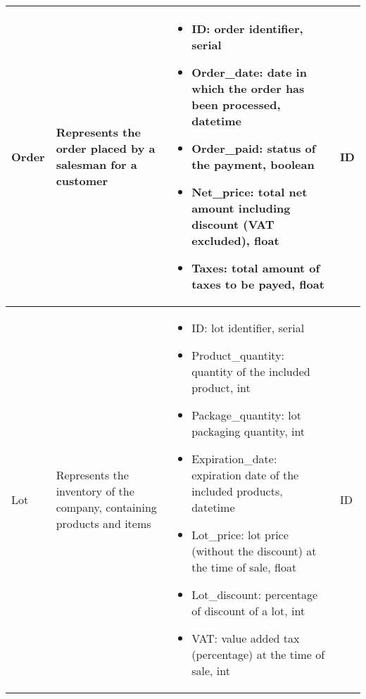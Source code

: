 \begin{longtable}{|p{}|p{} |p{}|p{} |}
    Order & Represents the order placed by a salesman for a customer &
    \begin{itemize}
        \vspace{-1em}
        \item ID:   order identifier, serial
        \item Order\_date:   date in which the order has been processed, datetime
        \item Order\_paid:   status of the payment, boolean
        \item Net\_price:   total net amount including discount (VAT excluded), float    %
        \item Taxes:   total amount of taxes to be payed, float                     %
    \end{itemize}
    &  ID \\\hline


    Lot & Represents the inventory of the company, containing products and items &
    \begin{itemize}
        \vspace{-1em}
        \item ID:   lot identifier, serial
        \item Product\_quantity:   quantity of the included product, int
        \item Package\_quantity:   lot packaging quantity, int
        \item Expiration\_date:   expiration date of the included products, datetime
        \item Lot\_price:   lot price (without the discount) at the time of sale, float
        \item Lot\_discount:   percentage of discount of a lot, int
        \item VAT:   value added tax (percentage) at the time of sale, int
    \end{itemize}
    &  ID \\\hline



\end{longtable}
